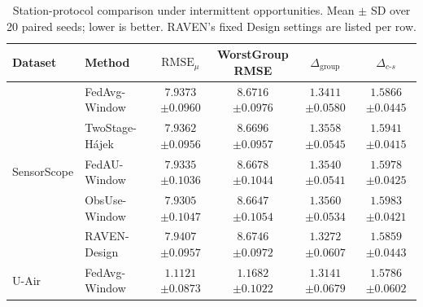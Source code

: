 \begin{table}[t]
\centering
\caption{Station-protocol comparison under intermittent opportunities.
Mean $\pm$ SD over 20 paired seeds; lower is better.
RAVEN's fixed Design settings are listed per row.}
\label{tab:int_r_e3}
\footnotesize
\setlength{\tabcolsep}{1pt}
\begin{tabular*}{\textwidth}{@{\extracolsep{\fill}}llcccc}
\toprule
Dataset & Method & $\mathrm{RMSE}_{\mu}$ & \shortstack{WorstGroup\\RMSE} &
$\Delta_{\mathrm{group}}$ & $\Delta_{c\text{-}s}$\\
\midrule
\multirow{5}{*}{SensorScope}
& FedAvg-Window     & \shortstack{$7.9373$\\$\pm0.0960$} & \shortstack{$8.6716$\\$\pm0.0976$} & \shortstack{$1.3411$\\$\pm0.0580$} & \shortstack{$1.5866$\\$\pm0.0445$}\\
& TwoStage-H\'ajek    & \shortstack{$7.9362$\\$\pm0.0956$} & \shortstack{$8.6696$\\$\pm0.0957$} & \shortstack{$1.3558$\\$\pm0.0545$} & \shortstack{$1.5941$\\$\pm0.0415$}\\
& FedAU-Window      & \shortstack{$7.9335$\\$\pm0.1036$} & \shortstack{$8.6678$\\$\pm0.1044$} & \shortstack{$1.3540$\\$\pm0.0541$} & \shortstack{$1.5978$\\$\pm0.0425$}\\
& ObsUse-Window     & \shortstack{$7.9305$\\$\pm0.1047$} & \shortstack{$8.6647$\\$\pm0.1054$} & \shortstack{$1.3560$\\$\pm0.0534$} & \shortstack{$1.5983$\\$\pm0.0421$}\\
& RAVEN-Design & \shortstack{$7.9407$\\$\pm0.0957$} & \shortstack{$8.6746$\\$\pm0.0972$} & \shortstack{$\mathbf{1.3272}$\\$\pm0.0607$} & \shortstack{$1.5859$\\$\pm0.0443$}\\
\midrule
\multirow{6}{*}{U-Air}
& FedAvg-Window     & \shortstack{$1.1121$\\$\pm0.0873$} & \shortstack{$1.1682$\\$\pm0.1022$} & \shortstack{$1.3141$\\$\pm0.0679$} & \shortstack{$1.5786$\\$\pm0.0602$}\\

\end{tabular*}
\end{table}
